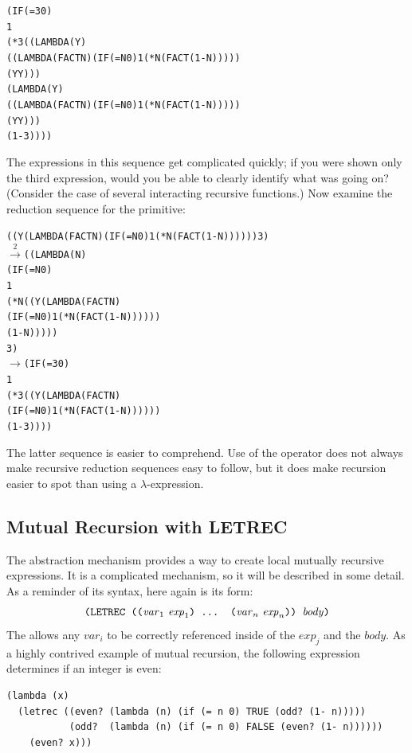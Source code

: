 \par\smallskip
\par\smallskip\noindent\begin{minipage}{\linewidth}
\begin{alltt}
(IF (= 3 0)
    1
    (* 3 ((LAMBDA (Y)
            ((LAMBDA (FACT N) (IF (= N 0) 1 (* N (FACT (1- N)))))
             (Y Y)))
          (LAMBDA (Y)
            ((LAMBDA (FACT N) (IF (= N 0) 1 (* N (FACT (1- N)))))
             (Y Y)))
          (1- 3))))
\end{alltt}
\end{minipage}\par\smallskip

The expressions in this sequence get complicated quickly; if you were shown only
the third expression, would you be able to clearly identify what was going on?
(Consider the case of several interacting recursive functions.) Now examine the
reduction sequence for the  primitive:
\par\smallskip\noindent\begin{minipage}{\linewidth}
\begin{alltt}
((Y (LAMBDA (FACT N) (IF (= N 0) 1 (* N (FACT (1- N)))))) 3)
  \(\xrightarrow{2}\) ((LAMBDA (N)
        (IF (= N 0)
            1
            (* N ((Y (LAMBDA (FACT N)
                       (IF (= N 0) 1 (* N (FACT (1- N))))))
                  (1- N)))))
      3)
  \(\longrightarrow\) (IF (= 3 0)
         1
         (* 3 ((Y (LAMBDA (FACT N)
                    (IF (= N 0) 1 (* N (FACT (1- N))))))
               (1- 3))))
\end{alltt}
\end{minipage}\par\smallskip

The latter sequence is easier to comprehend. Use of the  operator does
not always make recursive reduction sequences easy to follow, but it does make
recursion easier to spot than using a \(\lambda\)-expression.

\subsection{Mutual Recursion with LETREC}

The  abstraction mechanism provides a way to create local mutually
recursive expressions. It is a complicated mechanism, so it will be described in
some detail. As a reminder of its syntax, here again is its form:
\[
\THOR{(LETREC ((}\mathit{var}_1\ \mathit{exp}_1\THOR{) ... (}\mathit{var}_n\ \mathit{exp}_n\THOR{)) }\mathit{body}\THOR{)}
\]
The  allows any \(\mathit{var}_i\) to be correctly referenced inside of
the \(\mathit{exp}_j\) and the \(\mathit{body}\). As a highly contrived example of mutual recursion,
the following expression determines if an integer is even:
\begin{verbatim}
(lambda (x)
  (letrec ((even? (lambda (n) (if (= n 0) TRUE (odd? (1- n)))))
           (odd?  (lambda (n) (if (= n 0) FALSE (even? (1- n))))))
    (even? x)))
\end{verbatim}


